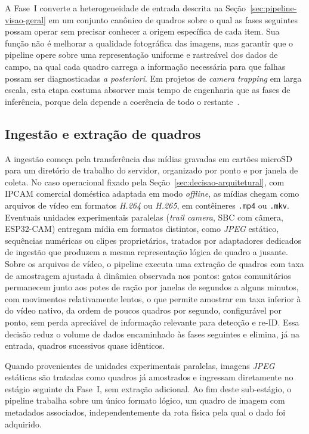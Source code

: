 A Fase~I converte a heterogeneidade de entrada descrita na Seção~\ref{sec:pipeline-visao-geral} em um conjunto canônico de quadros sobre o qual as fases seguintes possam operar sem precisar conhecer a origem específica de cada item. Sua função não é melhorar a qualidade fotográfica das imagens, mas garantir que o pipeline opere sobre uma representação uniforme e rastreável dos dados de campo, na qual cada quadro carrega a informação necessária para que falhas possam ser diagnosticadas \textit{a posteriori}. Em projetos de \textit{camera trapping} em larga escala, esta etapa costuma absorver mais tempo de engenharia que as fases de inferência, porque dela depende a coerência de todo o restante~\cite{velez2022choosing,bruce2025largescale}.

\subsection*{Ingestão e extração de quadros}

A ingestão começa pela transferência das mídias gravadas em cartões microSD para um diretório de trabalho do servidor, organizado por ponto e por janela de coleta. No caso operacional fixado pela Seção~\ref{sec:decisao-arquitetural}, com IPCAM comercial doméstica adaptada em modo \textit{offline}, as mídias chegam como arquivos de vídeo em formatos \textit{H.264} ou \textit{H.265}, em contêineres \texttt{.mp4} ou \texttt{.mkv}. Eventuais unidades experimentais paralelas (\textit{trail camera}, SBC com câmera, ESP32-CAM) entregam mídia em formatos distintos, como \textit{JPEG} estático, sequências numéricas ou clipes proprietários, tratados por adaptadores dedicados de ingestão que produzem a mesma representação lógica de quadro a jusante. Sobre os arquivos de vídeo, o pipeline executa uma extração de quadros com taxa de amostragem ajustada à dinâmica observada nos pontos: gatos comunitários permanecem junto aos potes de ração por janelas de segundos a alguns minutos, com movimentos relativamente lentos, o que permite amostrar em taxa inferior à do vídeo nativo, da ordem de poucos quadros por segundo, configurável por ponto, sem perda apreciável de informação relevante para detecção e re-ID. Essa decisão reduz o volume de dados encaminhado às fases seguintes e elimina, já na entrada, quadros sucessivos quase idênticos.

Quando provenientes de unidades experimentais paralelas, imagens \textit{JPEG} estáticas são tratadas como quadros já amostrados e ingressam diretamente no estágio seguinte da Fase~I, sem extração adicional. Ao fim deste sub-estágio, o pipeline trabalha sobre um único formato lógico, um quadro de imagem com metadados associados, independentemente da rota física pela qual o dado foi adquirido.

